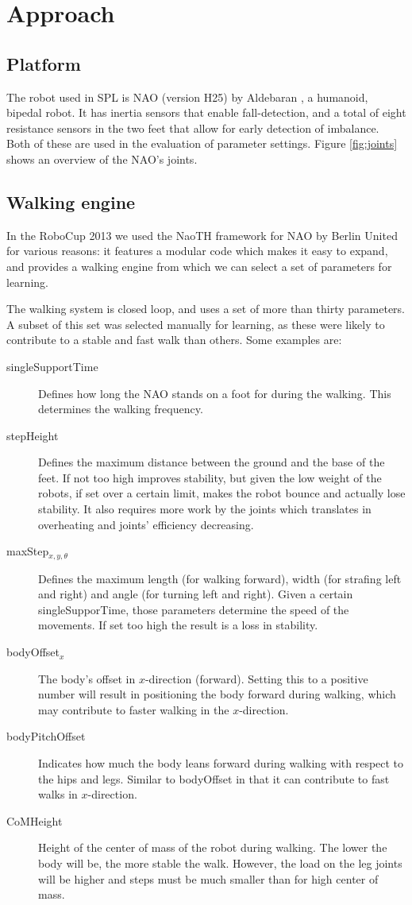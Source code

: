 \documentclass{article}
\begin{document}
\section{Approach}
\subsection{Platform}
The robot used in SPL is NAO (version H25) by Aldebaran \citep{gouaillier2009mechatronic}, a humanoid, bipedal robot. It has inertia sensors that enable fall-detection, and a total of eight resistance sensors in the two feet that allow for early detection of imbalance. Both of these are used in the evaluation of parameter settings. Figure \ref{fig:joints} shows an overview of the NAO's joints.

\subsection{Walking engine}
In the RoboCup 2013 we used the NaoTH framework for NAO by Berlin United
\cite{naothdescription} for various reasons: it features a modular code which
makes it easy to expand, and provides a walking engine from which we can select
a set of parameters for learning. 

The walking system is closed loop, and uses a set of more than thirty parameters. A subset of this set was selected manually for learning, as these were likely to contribute to a stable and fast walk than others.
Some examples are:
\begin{description}
\item[singleSupportTime] Defines how long the NAO stands on a foot for during the walking. This determines the walking frequency.
\item[stepHeight] Defines the maximum distance between the ground and the base of the feet. If not too high improves stability, but given the low weight of the robots, if set over a certain limit, makes the robot bounce and actually lose stability. It also requires more work by the joints which translates in overheating and joints' efficiency decreasing. 
\item[maxStep$_{x,y, \theta }$] Defines the maximum length (for walking forward), width (for strafing left and right) and angle (for turning left and right). Given a certain singleSupporTime, those parameters determine the speed of the movements. If set too high the result is a loss in stability.
\item[bodyOffset$_{x}$] The body's offset in $x$-direction (forward). Setting this to a positive number will result in positioning the body forward during walking, which may contribute to faster walking in the $x$-direction.
\item[bodyPitchOffset] Indicates how much the body leans forward during walking with respect to the hips and legs. Similar to bodyOffset in that it can contribute to fast walks in $x$-direction. 
\item[CoMHeight] Height of the center of mass of the robot during walking. The lower the body will be, the more stable the walk. However, the load on the leg joints will be higher and steps must be much smaller than for high center of mass. 
\end{description}
\end{document}
